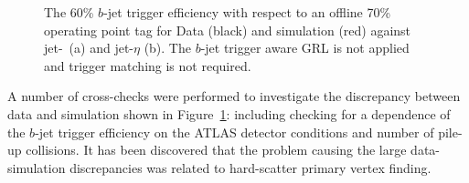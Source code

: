 \begin{figure}[!t]
  \begin{center}
    \captionsetup[subfigure]{aboveskip=0pt,justification=centering}
  \end{center}
  \caption[The 60\% $b$-jet trigger efficiency with respect to an offline 70\% operating point tag in Data and simulation
    when the $b$-jet trigger aware GRL is not applied and trigger matching is not required.]
  {The 60\% $b$-jet trigger efficiency with respect to an offline 70\% operating point tag
    for Data (black) and simulation (red) against jet-\pT~(a) and jet-$\eta$ (b).
    The $b$-jet trigger aware GRL is not applied and trigger matching is not required.}
  \label{fig:trig-Full_noGRL_eff_noHLTMatch}
\end{figure}


A number of cross-checks were performed to investigate the discrepancy between data and simulation shown in Figure~\ref{fig:trig-Full_noGRL_eff_noHLTMatch}:
including checking for a dependence of the $b$-jet trigger efficiency on the ATLAS detector conditions and number of pile-up collisions.
It has been discovered that the problem causing the large data-simulation discrepancies was related to hard-scatter primary vertex finding.

